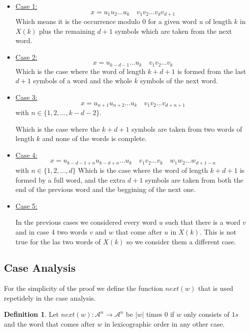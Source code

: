 \documentclass[11pt,a4paper,twoside]{tesis}
\theoremstyle{definition}
\newtheorem{definition}{Definition}[section]
\begin{document}
\begin{itemize}
  \item \underline{Case 1:} 
  $$x = u_1 u_2 \dots u_k \quad v_1 v_2 \dots v_{d} v_{d + 1}$$
    Which means it is the occurrence modulo 0 for a given word $u$ of length $k$ in $X(k)$ plus the remaining $d + 1$ symbols which are taken from the next word.

  \item \underline{Case 2:} 
  $$ x = u_{k-d-1} \dots u_k \quad v_1 v_2 \dots v_k$$
  Which is the case where the word of length $k + d + 1$ is formed from the last $d + 1$ symbols of a word and the whole $k$ symbols of the next word.

  \item \underline{Case 3:} 
  $$x = u_{n+1} u_{n+2} \dots u_k \quad  v_1 v_2 \dots v_{d+n+1} $$
with $n \in \{1,2,\dots ,k - d - 2\}$.

   Which is the case where the $k + d + 1$ symbols are taken from two words of length $k$ and none of the words is complete.

  
  \item \underline{Case 4:} 
  $$ x = u_{k-d-1+n} u_{k-d+n} \dots u_k \quad v_1 v_2 \dots v_k \quad w_1 w_2 \dots w_{d+1-n}$$
  with $n \in \{1, 2, \dots , d\}$
  Which is the case where the word of length $k + d + 1$ is formed by a full word, and the extra $d + 1$ symbols are taken from both the end of the previous word and the beggining of the next one.

  \item \underline{Case 5:} 
  
   In the previous cases we considered every word $u$ such that there is a word $v$ and in case 4 two words $v$ and $w$ that come after $u$ in $X(k)$. This is not true for the las two words of $X(k)$ so we consider them a different case.
  

\end{itemize}



\subsection{Case Analysis}
For the simplicity of the proof we define the function $next(w)$ that is used repetidely in the case analysis.

\begin{definition}
    Let $next(w):\mathcal{A}^n \rightarrow \mathcal{A}^n $ be $|w|$ times 0 if $w$ only consists of $1s$ and the word that comes after $w$ in lexicographic order in any other case.
\end{definition}
\end{document}
